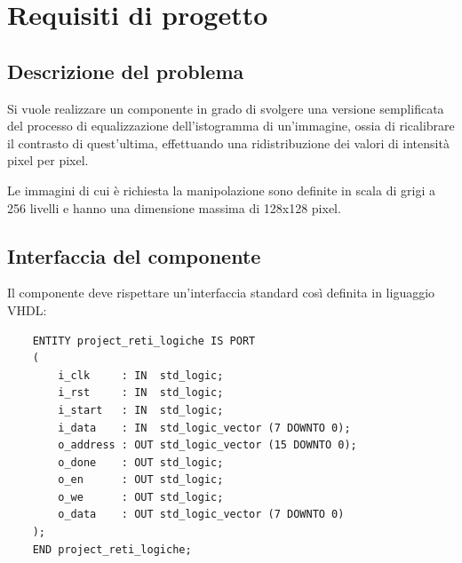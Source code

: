 \documentclass{article}
\begin{document}
\section{Requisiti di progetto} %
\subsection{Descrizione del problema} %
Si vuole realizzare un componente in grado di svolgere una versione semplificata del processo di equalizzazione dell’istogramma di un’immagine, ossia di ricalibrare il contrasto di quest’ultima,
effettuando una ridistribuzione dei valori di intensità pixel per pixel. \par
Le immagini di cui è richiesta la manipolazione sono definite in scala di grigi a 256 livelli e hanno una dimensione massima di 128x128 pixel.
\vspace{0,2cm} %

\subsection{Interfaccia del componente} %
Il componente deve rispettare un’interfaccia standard così definita in liguaggio VHDL:

\begin{verbatim}
    ENTITY project_reti_logiche IS PORT
	(
		i_clk     : IN  std_logic;
		i_rst     : IN  std_logic; 
		i_start   : IN  std_logic; 
		i_data    : IN  std_logic_vector (7 DOWNTO 0);
		o_address : OUT std_logic_vector (15 DOWNTO 0);
		o_done    : OUT std_logic; 
		o_en      : OUT std_logic;
		o_we      : OUT std_logic;
		o_data    : OUT std_logic_vector (7 DOWNTO 0) 
	);
    END project_reti_logiche;
\end{verbatim}
\vspace{0,2cm} %
\end{document}
